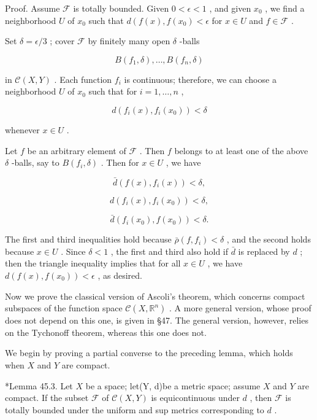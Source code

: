 Proof. Assume \(\mathcal{F}\) is totally bounded. Given \(0 < \epsilon  < 1\) , and given \({x}_{0}\) , we find a neighborhood \(U\) of \({x}_{0}\) such that \(d\left( {f\left( x\right) ,f\left( {x}_{0}\right)  < \epsilon }\right.\) for \(x \in  U\) and \(f \in  \mathcal{F}\) .

Set \(\delta  = \epsilon /3\) ; cover \(\mathcal{F}\) by finitely many open \(\delta\) -balls

\[
B\left( {{f}_{1},\delta }\right) ,\ldots ,B\left( {{f}_{n},\delta }\right)
\]

in \(\mathcal{C}\left( {X,Y}\right)\) . Each function \({f}_{i}\) is continuous; therefore, we can choose a neighborhood \(U\) of \({x}_{0}\) such that for \(i = 1,\ldots ,n\) ,

\[
d\left( {{f}_{i}\left( x\right) ,{f}_{i}\left( {x}_{0}\right) }\right)  < \delta
\]

whenever \(x \in  U\) .

Let \(f\) be an arbitrary element of \(\mathcal{F}\) . Then \(f\) belongs to at least one of the above \(\delta\) -balls, say to \(B\left( {{f}_{i},\delta }\right)\) . Then for \(x \in  U\) , we have

\[
\bar{d}\left( {f\left( x\right) ,{f}_{i}\left( x\right) }\right)  < \delta ,
\]

\[
d\left( {{f}_{i}\left( x\right) ,{f}_{i}\left( {x}_{0}\right) }\right)  < \delta ,
\]

\[
\bar{d}\left( {{f}_{i}\left( {x}_{0}\right) ,f\left( {x}_{0}\right) }\right)  < \delta .
\]

The first and third inequalities hold because \(\bar{\rho }\left( {f,{f}_{i}}\right)  < \delta\) , and the second holds because \(x \in  U\) . Since \(\delta  < 1\) , the first and third also hold if \(\bar{d}\) is replaced by \(d\) ; then the triangle inequality implies that for all \(x \in  U\) , we have \(d\left( {f\left( x\right) ,f\left( {x}_{0}\right) }\right)  < \epsilon\) , as desired.

Now we prove the classical version of Ascoli's theorem, which concerns compact subspaces of the function space \(\mathcal{C}\left( {X,{\mathbb{R}}^{n}}\right)\) . A more general version, whose proof does not depend on this one, is given in §47. The general version, however, relies on the Tychonoff theorem, whereas this one does not.

We begin by proving a partial converse to the preceding lemma, which holds when \(X\) and \(Y\) are compact.

*Lemma 45.3. Let \(X\) be a space; let(Y, d)be a metric space; assume \(X\) and \(Y\) are compact. If the subset \(\mathcal{F}\) of \(\mathcal{C}\left( {X,Y}\right)\) is equicontinuous under \(d\) , then \(\mathcal{F}\) is totally bounded under the uniform and sup metrics corresponding to \(d\) .

